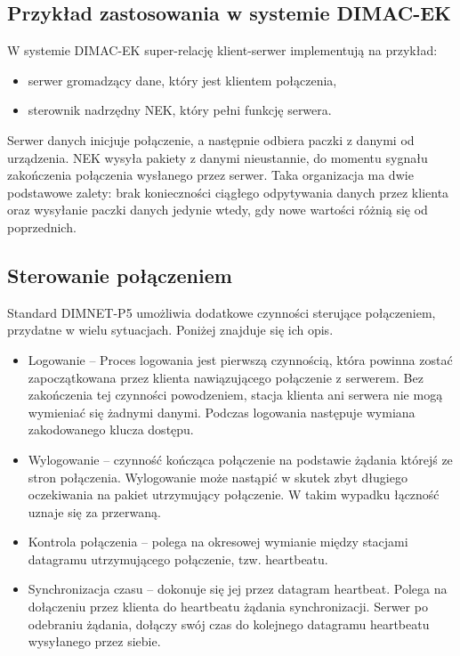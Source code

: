 \subsection{Przykład zastosowania w systemie DIMAC-EK}
W systemie DIMAC-EK super-relację klient-serwer implementują na przykład\cite{dimacek-wytyczne}:
\begin{itemize}
\item serwer gromadzący dane, który jest klientem połączenia,
\item sterownik nadrzędny NEK, który pełni funkcję serwera.
\end{itemize} 
Serwer danych inicjuje połączenie, a następnie odbiera paczki z danymi od urządzenia. NEK wysyła pakiety z danymi nieustannie, do momentu sygnału zakończenia połączenia wysłanego przez serwer. Taka organizacja ma dwie podstawowe zalety: brak konieczności ciągłego odpytywania danych przez klienta oraz wysyłanie paczki danych jedynie wtedy, gdy nowe wartości różnią się od poprzednich.

\subsection{Sterowanie połączeniem}
Standard DIMNET-P5 umożliwia dodatkowe czynności sterujące połączeniem, przydatne w wielu sytuacjach. Poniżej znajduje się ich opis.
\begin{itemize}
\item Logowanie -- Proces logowania jest pierwszą czynnością, która powinna zostać zapoczątkowana przez klienta nawiązującego połączenie z serwerem. Bez zakończenia tej czynności powodzeniem, stacja klienta ani serwera nie mogą wymieniać się żadnymi danymi. Podczas logowania następuje wymiana zakodowanego klucza dostępu.
\item Wylogowanie -- czynność kończąca połączenie na podstawie żądania którejś ze stron połączenia. Wylogowanie może nastąpić w skutek zbyt długiego oczekiwania na pakiet utrzymujący połączenie. W takim wypadku łączność uznaje się za przerwaną.
\item Kontrola połączenia -- polega na okresowej wymianie między stacjami datagramu utrzymującego połączenie, tzw. heartbeatu.
\item Synchronizacja czasu -- dokonuje się jej przez datagram heartbeat. Polega na dołączeniu przez klienta do heartbeatu żądania synchronizacji. Serwer po odebraniu żądania, dołączy swój czas do kolejnego datagramu heartbeatu wysyłanego przez siebie.
\end{itemize}


